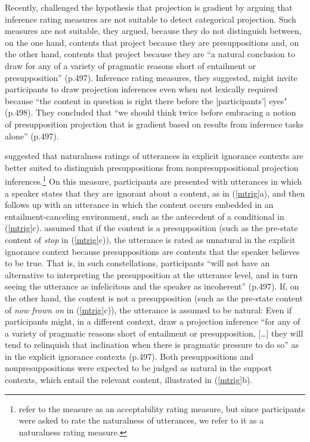 \documentclass[11pt,fleqn]{article}
\newcommand{\6}{\mbox{$[\hspace*{-.6mm}[$}}
\newcommand{\9}{\mbox{$]\hspace*{-.6mm}]$}}
\begin{document}
Recently,  \citealt*[\S6.2]{mandelkern-etal2020} challenged the hypothesis that projection is gradient by arguing that inference rating measures are not suitable to detect categorical projection. Such measures are not suitable, they argued, because they do not distinguish between, on the one hand, contents that project because they are presuppositions and, on the other hand, contents that project because they are ``a natural conclusion to draw for any of a variety of pragmatic reasons short of entailment or presupposition'' (p.497). Inference rating measures, they suggested, might invite participants to draw projection inferences even when not lexically required because ``the content in question is right there before the [participants'] eyes" (p.498). They concluded that ``we should think twice before embracing a notion of presupposition projection that is gradient based on results from inference tasks alone'' (p.497).

\citealt[\S6.2]{mandelkern-etal2020} suggested that naturalness ratings of utterances in explicit ignorance contexts are better suited to distinguish presuppositions from nonpresuppositional projection inferences.\footnote{\citealt{mandelkern-etal2020} refer to the measure as an acceptability rating measure, but since participants were asked to rate the naturalness of utterances, we refer to it as a naturalness rating measure.} On this measure, participants are presented with utterances in which a speaker states that they are ignorant about a content, as in (\ref{mtrig}a), and then follows up with an utterance in which the content occurs embedded in an entailment-canceling environment, such as the antecedent of a conditional in (\ref{mtrig}c). \citealt{mandelkern-etal2020} assumed that if the content is a presupposition (such as the pre-state content of {\em stop} in (\ref{mtrig}c)), the utterance is rated as unnatural in the explicit ignorance context because presuppositions are contents that the speaker believes to be true. That is, in such constellations,  participants ``will not have an alternative to interpreting the presupposition at the utterance level, and in turn seeing the utterance as infelicitous and the speaker as incoherent'' (p.497).  If, on the other hand, the content is not a presupposition (such as the pre-state content of {\em now frown on} in (\ref{mtrig}c)), the utterance is assumed to be natural: Even if participants might, in a different context, draw a projection inference ``for any of a variety of pragmatic reasons short of entailment or presupposition, [\ldots] they will tend to relinquish that inclination when there is pragmatic pressure to do so'' as in the explicit ignorance contexts (p.497). Both presuppositions and nonpresuppositions were expected to be judged as natural in the support contexts, which entail the relevant content, illustrated in (\ref{mtrig}b).
\end{document}
